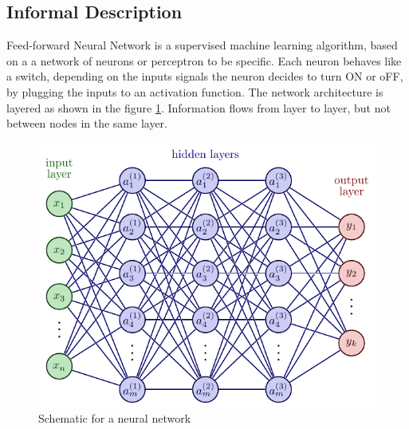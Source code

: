 \documentclass{article}
\begin{document}
\subsection{Informal Description}
Feed-forward Neural Network is a supervised machine learning algorithm, based on a a network of neurons 
or perceptron to be specific.  Each neuron behaves like a switch, depending on the inputs signals the neuron decides to 
turn ON or oFF, by plugging the inputs to an activation function. The network architecture is layered as shown in the figure \ref{fig:ffnl}.
Information flows from layer to layer, but not between nodes in the same layer. 
\begin{figure}
    \centering
    \includegraphics[scale=1]{ffnl.pdf}
    \caption{Schematic for a neural network}
    \label{fig:ffnl}
\end{figure}
\end{document}
